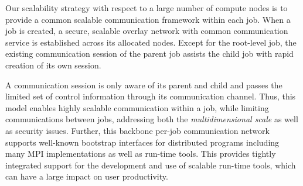 Our scalability strategy with respect to a large number 
of compute nodes is to provide a common scalable communication 
framework within each job. When a job is created, a secure, scalable 
overlay network with common communication service is established 
across its allocated nodes. Except for the root-level job, 
the existing communication session of the parent job assists 
the child job with rapid creation of its own session. 

A communication session is only aware of its parent 
and child and passes the limited set of control information 
through its communication channel. Thus, this model 
enables highly scalable communication within a job, while 
limiting communications between jobs, addressing 
both the {\em multidimensional scale} as well as security issues.
Further, this backbone per-job communication network 
supports well-known bootstrap interfaces 
for distributed programs including many MPI implementations 
as well as run-time tools. This provides tightly integrated support
for the development and use of scalable run-time tools, which 
can have a large impact on user productivity.
